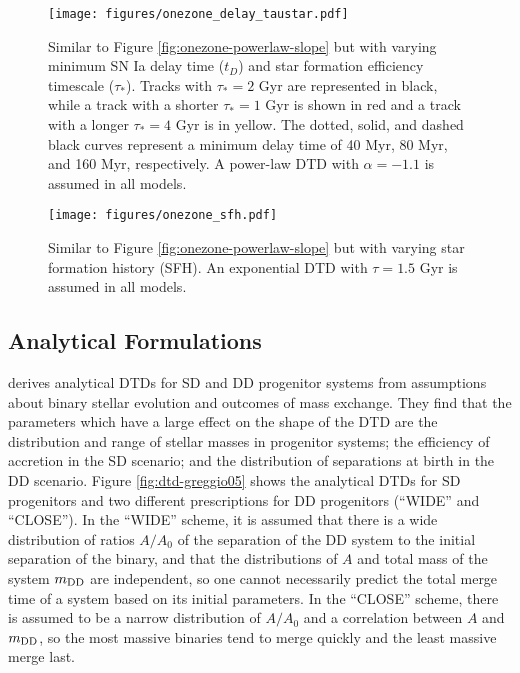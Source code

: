 \documentclass[twocolumn,linenumbers,twocolappendix]{aastex631}
\begin{document}
\begin{figure}
    \centering
    \texttt{[image: figures/onezone\_delay\_taustar.pdf]}
    \caption{Similar to Figure \ref{fig:onezone-powerlaw-slope} but with varying minimum SN Ia delay time ($t_D$) and star formation efficiency timescale ($\tau_*$). Tracks with $\tau_*=2$ Gyr are represented in black, while a track with a shorter $\tau_*=1$ Gyr is shown in red and a track with a longer $\tau_*=4$ Gyr is in yellow. The dotted, solid, and dashed black curves represent a minimum delay time of 40 Myr, 80 Myr, and 160 Myr, respectively. A power-law DTD with $\alpha=-1.1$ is assumed in all models.}
    \label{fig:onezone-delay-taustar}
\end{figure}

\begin{figure}
    \centering
    \texttt{[image: figures/onezone\_sfh.pdf]}
    \caption{Similar to Figure \ref{fig:onezone-powerlaw-slope} but with varying star formation history (SFH). An exponential DTD with $\tau=1.5$ Gyr is assumed in all models.}
    \label{fig:onezone-sfh}
\end{figure}

\subsection{Analytical Formulations}

\citet{Greggio2005-AnalyticalRates} derives analytical DTDs for SD and DD progenitor systems from assumptions about binary stellar evolution and outcomes of mass exchange. They find that the parameters which have a large effect on the shape of the DTD are the distribution and range of stellar masses in progenitor systems; the efficiency of accretion in the SD scenario; and the distribution of separations at birth in the DD scenario. Figure \ref{fig:dtd-greggio05} shows the analytical DTDs for SD progenitors and two different prescriptions for DD progenitors (``WIDE'' and ``CLOSE''). In the ``WIDE'' scheme, it is assumed that there is a wide distribution of ratios $A/A_0$ of the separation of the DD system to the initial separation of the binary, and that the distributions of $A$ and total mass of the system $m_{\rm DD}$ are independent, so one cannot necessarily predict the total merge time of a system based on its initial parameters. In the ``CLOSE'' scheme, there is assumed to be a narrow distribution of $A/A_0$ and a correlation between $A$ and $m_{\rm DD}$, so the most massive binaries tend to merge quickly and the least massive merge last.
\end{document}
